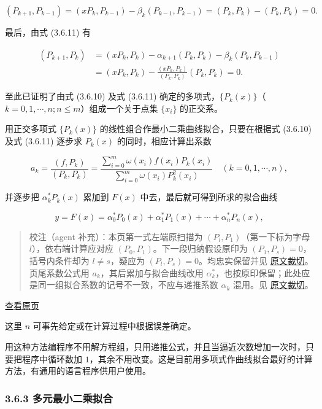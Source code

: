 \documentclass[
  10pt,
  fontset=fandol]{ctexart}
\begin{document}
\[
(P_{k+1},P_{k-1})=(xP_k,P_{k-1})-\beta_k(P_{k-1},P_{k-1})=(P_k,P_k)-(P_k,P_k)=0.
\]

最后，由式 (3.6.11) 有

\[
\begin{aligned}
(P_{k+1},P_k)&=(xP_k,P_k)-\alpha_{k+1}(P_k,P_k)-\beta_k(P_k,P_{k-1})\\
&=(xP_k,P_k)-\frac{(xP_k,P_k)}{(P_k,P_k)}(P_k,P_k)=0.
\end{aligned}
\]

至此已证明了由式 (3.6.10) 及式 (3.6.11) 确定的多项式，\(\{P_k(x)\}\)（\(k=0,1,\cdots,n;n\leqslant m\)）组成一个关于点集 \(\{x_i\}\) 的正交系。

用正交多项式 \(\{P_k(x)\}\) 的线性组合作最小二乘曲线拟合，只要在根据式 (3.6.10) 及式 (3.6.11) 逐步求 \(P_k(x)\) 的同时，相应计算出系数

\[
a_k=\frac{(f,P_k)}{(P_k,P_k)}=\frac{\displaystyle\sum_{i=0}^m\omega(x_i)f(x_i)P_k(x_i)}{\displaystyle\sum_{i=0}^m\omega(x_i)P_k^2(x_i)}\quad(k=0,1,\cdots,n),
\]

并逐步把 \(\alpha_k^*P_k(x)\) 累加到 \(F(x)\) 中去，最后就可得到所求的拟合曲线

\[
y=F(x)=\alpha_0^*P_0(x)+\alpha_1^*P_1(x)+\cdots+\alpha_n^*P_n(x),
\]

\begin{quote}
校注（agent 补充）：本页第一式左端原扫描为 \((P_l,P_1)\)（第一下标为字母 \(l\)），依右端计算应对应 \((P_0,P_1)\)。下一段归纳假设原印为 \((P_1,P_s)=0\)，括号内条件却为 \(l\ne s\)，疑应为 \((P_l,P_s)=0\)。均忠实保留并见 \href{../assets/ch03b/p083-induction-start.png}{原文裁切}。页尾系数公式用 \(a_k\)，其后累加与拟合曲线改用 \(\alpha_k^*\)，也按原印保留；此处应是同一组拟合系数的记号不一致，不应与递推系数 \(\alpha_k\) 混用。见 \href{../assets/ch03b/p083-fit-coefficients.png}{原文裁切}。
\end{quote}

\href{../../source-images/pdf-084.jpeg}{查看原页}

这里 \(n\) 可事先给定或在计算过程中根据误差确定。

用这种方法编程序不用解方程组，只用递推公式，并且当逼近次数增加一次时，只要把程序中循环数加 \(1\)，其余不用改变。这是目前用多项式作曲线拟合最好的计算方法，有通用的语言程序供用户使用。

\subsubsection{3.6.3 多元最小二乘拟合}\label{ux591aux5143ux6700ux5c0fux4e8cux4e58ux62dfux5408}
\end{document}
